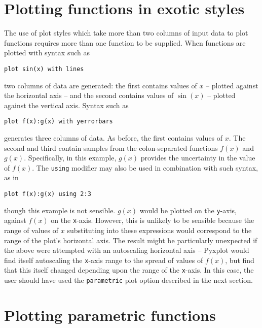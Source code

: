 \section{Plotting functions in exotic styles}

The use of plot styles which take more than two columns of input data to plot
functions requires more than one function to be supplied.  When functions are
plotted with syntax such as

\begin{verbatim}
plot sin(x) with lines
\end{verbatim}

\noindent two columns of data are generated: the first contains values of $x$
-- plotted against the horizontal axis -- and the second contains values of
$\sin(x)$ -- plotted against the vertical axis. Syntax such as

\begin{verbatim}
plot f(x):g(x) with yerrorbars
\end{verbatim}

\noindent generates three columns of data. As before, the first contains values
of $x$. The second and third contain samples from the colon-separated functions
$f(x)$ and $g(x)$. Specifically, in this example, $g(x)$ provides the
uncertainty in the value of $f(x)$.  The {\tt using} modifier may also be used
in combination with such syntax, as in

\begin{verbatim}
plot f(x):g(x) using 2:3
\end{verbatim}

\noindent though this example is not sensible. $g(x)$ would be plotted on the
{\tt y}-axis, against $f(x)$ on the {\tt x}-axis. However, this is unlikely to be
sensible because the range of values of $x$ substituting into these expressions
would correspond to the range of the plot's horizontal axis. The result might
be particularly unexpected if the above were attempted with an autoscaling
horizontal axis -- Pyxplot would find itself autoscaling the {\tt x}-axis range
to the spread of values of $f(x)$, but find that this itself changed depending
upon the range of the {\tt x}-axis. In this case, the user should have used the
{\tt parametric} plot option described in the next section.

\section{Plotting parametric functions}
\label{sec:parametric_plotting}

